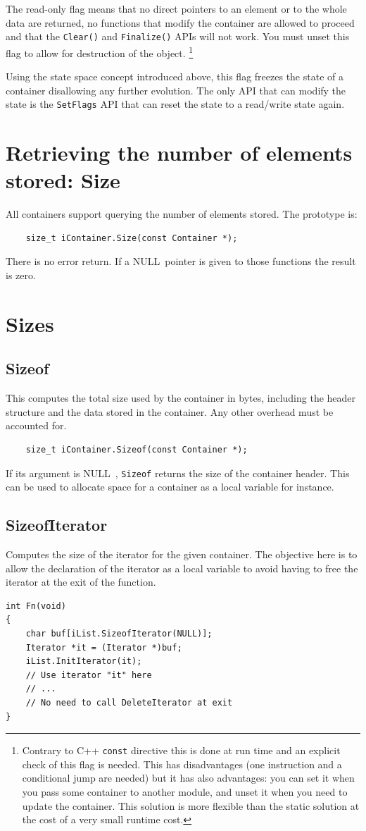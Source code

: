 \documentclass[12pt,a4paper]{memoir} %
\newif\iftth
\newcommand{\Null}{{\iftth \ NULL \else \footnotesize NULL\  \fi}}
\begin{document}
The read-only flag means that no direct pointers to an element or to the whole data are returned, no functions that modify the
container are allowed to proceed and that the \verb,Clear(),
and \verb,Finalize(), APIs will not work. You must unset this flag to allow for destruction of the object.
\footnote{Contrary to C++ \texttt{const} directive this is done at run time and an explicit check of this flag is needed. This has disadvantages 
(one instruction and a conditional jump are needed) but it has also advantages: you can set it when you pass some container to another module, and unset it when you need to update the container. This solution is more flexible than the static solution at the cost of a very small runtime cost.}

Using the state space concept introduced above, this flag freezes the state of a container disallowing any further evolution. The only API that
can modify the state is the \verb,SetFlags, API that can reset the state to a read/write state again.
\section{Retrieving the number of elements stored: Size}
All containers support querying the number of elements stored. The prototype is:
\begin{verbatim}
    size_t iContainer.Size(const Container *);
\end{verbatim}
There is no error return. If a \Null pointer is given to those functions the result is zero.
\section{Sizes}
\subsection{Sizeof}
This computes the total size used by the container in bytes, including the header structure and the data stored in the container. Any other overhead 
must be accounted for.
\begin{verbatim}
    size_t iContainer.Sizeof(const Container *);
\end{verbatim}

If its argument is \Null, \texttt{Sizeof} returns the size of the container header. This can be used to allocate space for a container as a local variable for instance.

\subsection{SizeofIterator}
Computes the size of the iterator for the given container. The objective here is to allow the declaration of the iterator as a local variable
to avoid having to free the iterator at the exit of the function.
\begin{verbatim}
int Fn(void)
{
    char buf[iList.SizeofIterator(NULL)];
    Iterator *it = (Iterator *)buf;
    iList.InitIterator(it);
    // Use iterator "it" here
    // ...
    // No need to call DeleteIterator at exit
}
\end{verbatim}
\end{document}
